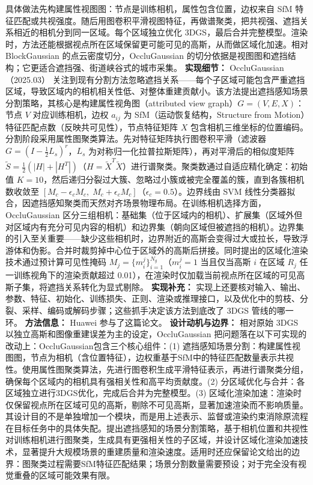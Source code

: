 具体做法先构建属性视图图：节点是训练相机，属性包含位置，边权来自 SfM 特征匹配或共视强度。随后用图卷积平滑视图特征，再做谱聚类，把共视强、遮挡关系相近的相机分到同一区域。每个区域独立优化 3DGS，最后合并完整模型。渲染时，方法还能根据视点所在区域保留更可能可见的高斯，从而做区域化加速。相对 BlockGaussian 的点云密度切分，OccluGaussian 的切分依据是视图图和遮挡结构；它更适合遮挡强、街道峡谷式的城市采集。
\textbf{实现细节：} OccluGaussian（2025.03） 关注到现有分割方法忽略遮挡关系——每个子区域可能包含严重遮挡区域，导致区域内的相机相关性低、对整体重建贡献小。该方法提出遮挡感知场景分割策略，其核心是构建属性视角图（attributed view graph）$G = (V, E, X)$：节点 $V$ 对应训练相机，边权 $a_{ij}$ 为 SfM（运动恢复结构，Structure from Motion）特征匹配点数（反映共可见性），节点特征矩阵 $X$ 包含相机三维坐标的位置编码。分割阶段采用属性图聚类算法。先对特征矩阵执行图卷积平滑（滤波器 $G = (I - \frac{1}{2}L_s)^r$，$L_s$ 为对称归一化拉普拉斯矩阵），再对平滑后的相似度矩阵 $\tilde{S} = \frac{1}{2}(|H| + |H^T|)$（$H = \tilde{X}^T\tilde{X}$）进行谱聚类。聚类数通过自适应精化确定：初始值 $K=10$，然后递归分裂过大簇、忽略过小簇或被完全覆盖的簇，直到各簇相机数收敛至 $[M_c - \epsilon_c M_c,\; M_c + \epsilon_c M_c]$（$\epsilon_c = 0.5$）。边界线由 SVM 线性分类器拟合，因遮挡感知聚类而天然对齐场景物理布局。在训练相机选择方面，OccluGaussian 区分三组相机：基础集（位于区域内的相机）、扩展集（区域外但对区域内有充分可见内容的相机）和边界集（朝向区域但被遮挡的相机）。边界集的引入至关重要——缺少这些相机时，边界附近的高斯会变得过大或拉长，导致浮游体和伪影。合并时裁剪掉中心位于区域外的高斯后拼接。同时提出的区域化渲染技术通过预计算可见性掩码 $M_j = \{m_i^j\}_{i=1}^{N_g}$（$m_i^j = 1$ 当且仅当高斯 $i$ 在区域 $R_j$ 任一训练视角下的渲染贡献超过 0.01），在渲染时仅加载当前视点所在区域的可见高斯子集，将遮挡关系转化为显式剔除。
\textbf{实现补充：} 实现上还要核对输入、输出、参数、特征、初始化、训练损失、正则、渲染或推理接口，以及优化中的剪枝、分裂、采样、编码或解码步骤；这些抓手决定该方法到底改了 3DGS 管线的哪一环。
\textbf{方法信息：} Huawei 参与了这篇论文。
\textbf{设计动机与边界：} 相对原始 3DGS 以独立高斯和图像重建误差为主的设定，OccluGaussian 把问题落在以下可实现的改动上：OccluGaussian包含三个核心组件：(1) 遮挡感知场景分割：构建属性视图图，节点为相机（含位置特征），边权重基于SfM中的特征匹配数量表示共视性。使用属性图聚类算法，先进行图卷积生成平滑特征表示，再进行谱聚类分组，确保每个区域内的相机具有强相关性和高平均贡献度。(2) 分区域优化与合并：各区域独立进行3DGS优化，完成后合并为完整模型。(3) 区域化渲染加速：渲染时仅保留视点所在区域可见的高斯，剔除不可见高斯，显著加速渲染而不影响质量。其设计目的不是单独增加一个模块，而是用上述表示、监督或渲染约束消除原流程在目标任务中的具体失配。提出遮挡感知的场景分割策略，基于相机位置和共视性对训练相机进行图聚类，生成具有更强相关性的子区域，并设计区域化渲染加速技术，显著提升大规模场景的重建质量和渲染速度。适用时还应保留论文给出的边界：图聚类过程需要SfM特征匹配结果；场景分割数量需要预设；对于完全没有视觉重叠的区域可能效果有限。
